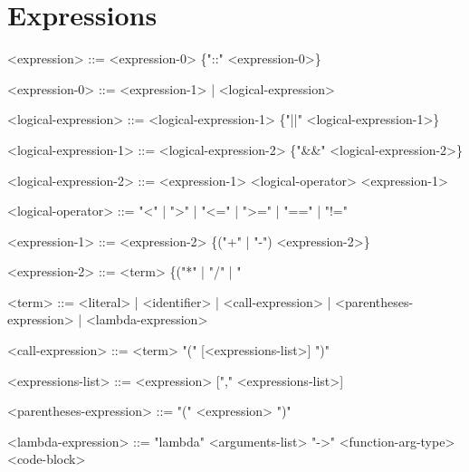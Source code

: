 \documentclass{article}
\begin{document}
\section{Expressions}
\begin{grammar}
<expression> ::= <expression-0> \{"::" <expression-0>\}

<expression-0> ::= <expression-1> | <logical-expression>

<logical-expression> ::= <logical-expression-1> \{"||" <logical-expression-1>\}

<logical-expression-1> ::= <logical-expression-2> \{"&&" <logical-expression-2>\}

<logical-expression-2> ::= <expression-1> <logical-operator> <expression-1>

<logical-operator> ::= "\textless" | "\textgreater" | "\textless=" | "\textgreater=" | "==" | "!="

<expression-1> ::= <expression-2> \{("+" | "-") <expression-2>\}

<expression-2> ::= <term> \{("*" | "/" | "%

<term> ::= <literal> | <identifier> | <call-expression> | <parentheses-expression> | <lambda-expression>

<call-expression> ::= <term> "(" [<expressions-list>] ")"

<expressions-list> ::= <expression> ["," <expressions-list>]

<parentheses-expression> ::= "(" <expression> ")"

<lambda-expression> ::= "lambda" <arguments-list> "->" <function-arg-type> <code-block>
\end{grammar}
\end{document}
